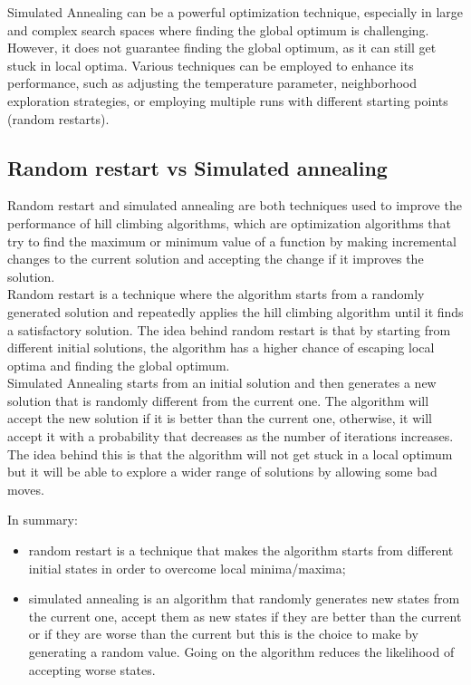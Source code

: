 \documentclass{article}
\begin{document}
Simulated Annealing can be a powerful optimization technique, especially in large and complex search spaces where finding the global optimum is challenging. However, it does not guarantee finding the global optimum, as it can still get stuck in local optima. Various techniques can be employed to enhance its performance, such as adjusting the temperature parameter, neighborhood exploration strategies, or employing multiple runs with different starting points (random restarts).

\subsection{Random restart vs Simulated annealing}

Random restart and simulated annealing are both techniques used to improve the performance of hill climbing algorithms, which are optimization algorithms that try to find the maximum or minimum value of a function by making incremental changes to the current solution and accepting the change if it improves the solution. \\

Random restart is a technique where the algorithm starts from a randomly generated solution and repeatedly applies the hill climbing algorithm until it finds a satisfactory solution. The idea behind random restart is that by starting from different initial solutions, the algorithm has a higher chance of escaping local optima and finding the global optimum. \\

Simulated Annealing starts from an initial solution and then generates a new solution that is randomly different from the current one. The algorithm will accept the new solution if it is better than the current one, otherwise, it will accept it with a probability that decreases as the number of iterations increases. The idea behind this is that the algorithm will not get stuck in a local optimum but it will be able to explore a wider range of solutions by allowing some bad moves.

In summary:
\begin{itemize}
    \item random restart is a technique that makes the algorithm starts from different initial states in order to overcome local minima/maxima;
    \item simulated annealing is an algorithm that randomly generates new states from the current one, accept them as new states if they are better than the current or if they are worse than the current but this is the choice to make by generating a random value. Going on the algorithm reduces the likelihood of accepting worse states.
\end{itemize}
\end{document}
